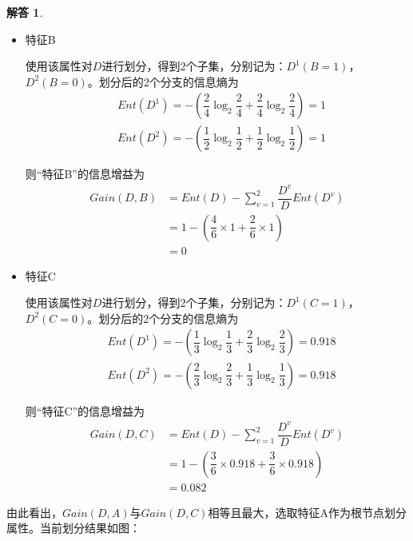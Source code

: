 \documentclass[a4paper,UTF8]{article}
\numberwithin{equation}{section}
\theoremstyle{definition}
\newtheorem*{solution}{解答}
\begin{document}
\begin{solution}
\begin{itemize}
    \item 特征B

        使用该属性对$D$进行划分，得到2个子集，分别记为：$D^1(B=1)$，$D^2(B=0)$。划分后的2个分支的信息熵为
        \begin{align*}
            &Ent(D^1) = -(\dfrac{2}{4}\log_{2}{\dfrac{2}{4}}+\dfrac{2}{4}\log_{2}{\dfrac{2}{4}}) = 1 \\
            &Ent(D^2) = -(\dfrac{1}{2}\log_{2}{\dfrac{1}{2}}+\dfrac{1}{2}\log_{2}{\dfrac{1}{2}}) = 1
        \end{align*}

        则“特征B”的信息增益为
        \begin{align*}
            Gain(D,B) &= Ent(D)-\sum_{v=1}^{2}\dfrac{D^v}{D}Ent(D^v) \\
                      &= 1 - (\dfrac{4}{6} \times 1 + \dfrac{2}{6} \times 1) \\
                      &= 0
        \end{align*}
    
    \item 特征C
    
        使用该属性对$D$进行划分，得到2个子集，分别记为：$D^1(C=1)$，$D^2(C=0)$。划分后的2个分支的信息熵为
        \begin{align*}
            &Ent(D^1) = -(\dfrac{1}{3}\log_{2}{\dfrac{1}{3}}+\dfrac{2}{3}\log_{2}{\dfrac{2}{3}}) = 0.918 \\
            &Ent(D^2) = -(\dfrac{2}{3}\log_{2}{\dfrac{2}{3}}+\dfrac{1}{3}\log_{2}{\dfrac{1}{3}}) = 0.918
        \end{align*}

        则“特征C”的信息增益为
        \begin{align*}
            Gain(D,C) &= Ent(D)-\sum_{v=1}^{2}\dfrac{D^v}{D}Ent(D^v) \\
                      &= 1 - (\dfrac{3}{6} \times 0.918 + \dfrac{3}{6} \times 0.918) \\
                      &= 0.082
        \end{align*}
    
\end{itemize}

由此看出，$Gain(D,A)$与$Gain(D,C)$相等且最大，选取特征A作为根节点划分属性。当前划分结果如图：

\begin{figure}[H]
    \centering
    \begin{tikzpicture}
      [sibling distance=8em,
      level distance=4em,
      edge from parent/.style={draw, thick},
      edge from parent node/.style={fill=none, inner sep=1pt, draw=none},
      node style1/.style={draw, rectangle, rounded corners, align=center, minimum size=2em, fill=blue!10},
      node style2/.style={draw, rectangle, rounded corners, align=center, fill=green!10}
      ]
    

\end{tikzpicture}
\end{figure}
\end{solution}
\end{document}
